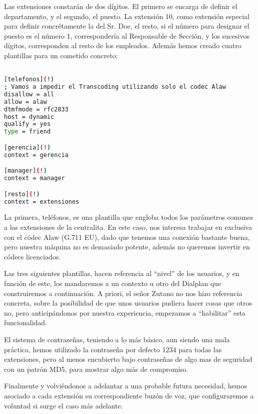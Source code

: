 
Las extensiones constarán de dos dígitos. El primero se encarga de definir el departamento, y el segundo, el puesto. La extensión 10, como extensión especial para definir concrétamente la del Sr. Doe, el resto, si el número para designar el puesto es el número 1, correspondería al Responsable de Sección, y los sucesivos dígitos, corresponden al resto de los empleados. Además hemos creado cuatro plantillas para un cometido concreto: 

\begin{lstlisting}[language=bash,title={/etc/asterisk/sip.conf}]

[telefonos](!)
; Vamos a impedir el Transcoding utilizando solo el codec Alaw
disallow = all
allow = alaw
dtmfmode = rfc2833
host = dynamic
qualify = yes
type = friend

[gerencia](!)
context = gerencia

[manager](!)
context = manager

[resto](!)
context = extensiones

\end{lstlisting}

La primera, teléfonos, es una plantilla que engloba todos los parámetros comunes a las extensiones de la centralita. En este caso, nos interesa trabajar en exclusiva con el códec Alaw (G.711 EU), dado que tenemos una conexión bastante buena, pero nuestra máquina no es demasiado potente, además no queremos invertir en códecs licenciados.

Las tres siguientes plantillas, hacen referencia al ``nivel'' de los usuarios, y en función de este, los mandaremos a un contexto u otro del Dialplan que construiremos a continuación. A priori, el señor Zutano no nos hizo referencia concreta, sobre la posibilidad de que unos usuarios pudiera hacer cosas que otros no, pero anticipándonos por nuestra experiencia, empezamos a ``habilitar'' esta funcionalidad.

El sistema de contraseñas, teniendo a lo más básico, aun siendo una mala práctica, hemos utilizado la contraseña por defecto 1234 para todas las extensiones, pero al menos encubierto bajo contraseñas de algo mas de seguridad con un patrón MD5, para mostrar algo más de compromiso.

Finalmente y volviéndonos a adelantar a una probable futura necesidad, hemos asociado a cada extensión su correspondiente buzón de voz, que configuraremos a voluntad si surge el caso más adelante.

